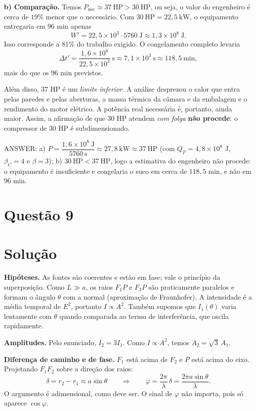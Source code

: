 \documentclass{article}%
\begin{document}
\textbf{b) Comparação.} Temos $P_{\text{nec}}\approx 37\ \mathrm{HP}>30\ \mathrm{HP}$, ou seja, o valor do engenheiro é cerca de $19\%$ menor que o necessário. Com $30\ \mathrm{HP}=22{,}5\ \mathrm{kW}$, o equipamento entregaria em $96$ min apenas
\[
W'=22{,}5\times10^{3}\cdot 5760\ \mathrm{J}\approx 1{,}3\times10^{8}\ \mathrm{J}.
\]
Isso corresponde a $81\%$ do trabalho exigido. O congelamento completo levaria
\[
\Delta t'=\frac{1{,}6\times10^{8}}{22{,}5\times10^{3}}\ \mathrm{s}\approx 7{,}1\times10^{3}\ \mathrm{s}\approx 118{,}5\ \mathrm{min},
\]
mais do que os $96$ min previstos.

Além disso, $37$ HP é um \emph{limite inferior}. A análise desprezou o calor que entra pelas paredes e pelas aberturas, a massa térmica da câmara e da embalagem e o rendimento do motor elétrico. A potência real necessária é, portanto, ainda maior. Assim, a afirmação de que $30$ HP atendem \emph{com folga} \textbf{não procede}: o compressor de $30$ HP é subdimensionado.

ANSWER: a) $P=\dfrac{1{,}6\times10^{8}\ \mathrm{J}}{5760\ \mathrm{s}}\approx 27{,}8\ \mathrm{kW}\approx 37\ \mathrm{HP}$ (com $Q_F=4{,}8\times10^{8}$ J, $\beta_C=4$ e $\beta=3$); b) $30\ \mathrm{HP}<37\ \mathrm{HP}$, logo a estimativa do engenheiro não procede: o equipamento é insuficiente e congelaria o suco em cerca de $118{,}5$ min, e não em $96$ min.%
\newpage%
\section*{Questão 9}

\section*{Solução}

\textbf{Hipóteses.} As fontes são coerentes e estão em fase; vale o princípio da superposição. Como $L \gg a$, os raios $F_1P$ e $F_2P$ são praticamente paralelos e formam o ângulo $\theta$ com a normal (aproximação de Fraunhofer). A intensidade é a média temporal de $E^2$, portanto $I \propto A^2$. Também supomos que $I_1(\theta)$ varia lentamente com $\theta$ quando comparada ao termo de interferência, que oscila rapidamente.

\textbf{Amplitudes.} Pelo enunciado, $I_2 = 3I_1$. Como $I\propto A^2$, temos $A_2=\sqrt{3}\,A_1$.

\textbf{Diferença de caminho e de fase.} $F_1$ está acima de $F_2$ e $P$ está acima do eixo. Projetando $F_1F_2$ sobre a direção dos raios:
\[
\delta = r_2 - r_1 \approx a\sin\theta
\qquad\Longrightarrow\qquad
\varphi = \frac{2\pi}{\lambda}\,\delta = \frac{2\pi a\sin\theta}{\lambda}.
\]
O argumento é adimensional, como deve ser. O sinal de $\varphi$ não importa, pois só aparece $\cos\varphi$.
\end{document}
